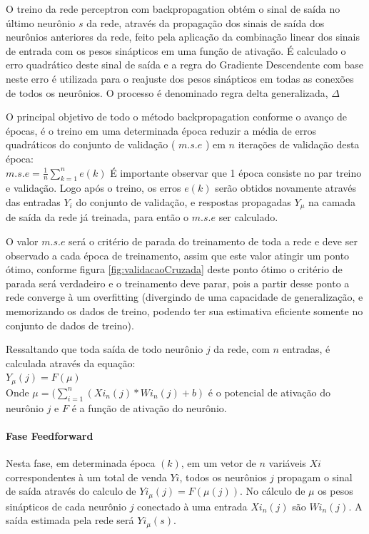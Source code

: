             O treino da rede perceptron com backpropagation obtém o sinal de saída no último neurônio $s$ da rede, através da propagação dos sinais de saída dos neurônios anteriores da rede, feito pela aplicação da combinação linear dos sinais de entrada com os pesos sinápticos em uma função de ativação. É calculado o erro quadrático deste sinal de saída e a regra do Gradiente Descendente com base neste erro é utilizada para o reajuste dos pesos sinápticos em todas as conexões de todos os neurônios. O processo é denominado regra delta generalizada, $\Delta$
            
            O principal objetivo de todo o método backpropagation conforme o avanço de épocas, é o treino em uma determinada época reduzir a média de erros quadráticos do conjunto de validação ( $m.s.e$ ) em $n$ iterações de validação desta época:\\
            $m.s.e = \frac{1}{n} \sum_{k=1}^{n}e(k)$
            É importante observar que 1 época consiste no par treino e validação. Logo após o treino, os erros $e(k)$ serão obtidos novamente através das entradas $Y_i$ do conjunto de validação, e respostas propagadas $Y_\mu$ na camada de saída da rede já treinada, para então o $m.s.e$ ser calculado.
            
            O valor $m.s.e$ será o critério de parada do treinamento de toda a rede e deve ser observado a cada época de treinamento, assim que este valor atingir um ponto ótimo, conforme figura \ref{fig:validacaoCruzada} deste ponto ótimo o critério de parada será verdadeiro e o treinamento deve parar, pois a partir desse ponto a rede converge à um overfitting (divergindo de uma capacidade de generalização, e memorizando os dados de treino, podendo ter sua estimativa eficiente somente no conjunto de dados de treino).
            
            Ressaltando que toda saída de todo neurônio $j$ da rede, com $n$ entradas, é calculada através da equação:\\
            $ Y_{\mu}(j) = F(\mu)$\\
            Onde $\mu = (\sum_{i=1}^{n} (Xi_{n}(j)*Wi_{n}(j) + b)$ é o potencial de ativação do neurônio $j$ e $F$ é a função de ativação do neurônio.
            
           \paragraph*{Fase Feedforward}
            Nesta fase, em determinada época $(k)$, em um vetor de $n$ variáveis $Xi$ correspondentes à um total de venda $Yi$, todos os neurônios $j$ propagam o sinal de saída através do calculo de $Yi_{\mu}(j) = F(\mu(j))$. No cálculo de $\mu$ os pesos sinápticos de cada neurônio $j$ conectado à uma entrada $Xi_{n}(j)$ são $Wi_{n}(j)$. A saída estimada pela rede será $Yi_{\mu}(s)$.
            
